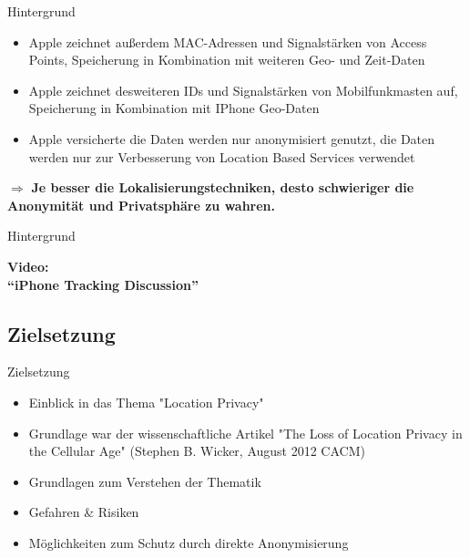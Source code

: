 \begin{frame}{Hintergrund}
\begin{itemize}
  \item Apple zeichnet außerdem MAC-Adressen und Signalstärken von Access Points, Speicherung in Kombination mit weiteren Geo- und Zeit-Daten
  \item Apple zeichnet desweiteren IDs und Signalstärken von Mobilfunkmasten auf, Speicherung in Kombination mit IPhone Geo-Daten
  \item Apple versicherte die Daten werden nur anonymisiert genutzt, die Daten werden nur zur Verbesserung von Location Based Services verwendet
\end{itemize}
$\Rightarrow$ \textbf{Je besser die Lokalisierungstechniken, desto schwieriger die Anonymität und Privatsphäre zu wahren.}
\end{frame}

\begin{frame}{Hintergrund}
\begin{center}
  \huge \textbf{Video:\\\vspace{1cm} ``iPhone Tracking Discussion''}
\end{center}
\vspace{2cm}
\begin{center}
  \href{run:iphone.mp4}{}
\end{center}
\end{frame}

\subsection{Zielsetzung}
\begin{frame}{Zielsetzung}
\begin{itemize}
  \item Einblick in das Thema "Location Privacy"
  \item Grundlage war der wissenschaftliche Artikel "The Loss of Location Privacy in the Cellular Age" (Stephen B. Wicker, August 2012 CACM)
  \item Grundlagen zum Verstehen der Thematik
  \item Gefahren \& Risiken
  \item Möglichkeiten zum Schutz durch direkte Anonymisierung
\end{itemize}
\end{frame}

